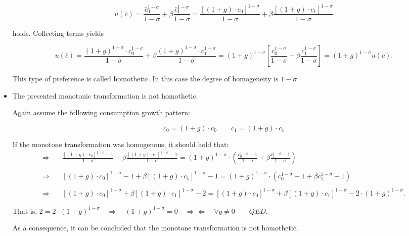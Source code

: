 \documentclass[12pt,a4paper]{article}
\begin{document}
\begin{itemize}
    $$  u(\bar{c}) = \frac{\bar{c}_0^{1 - \sigma}}{1 - \sigma} + \beta \frac{\bar{c}_1^{1 - \sigma}}{1 - \sigma} = \frac{[(1 + g) \cdot c_0]^{1-\sigma}}{1-\sigma} + \beta \frac{[(1 + g) \cdot c_1]^{1-\sigma}}{1-\sigma} $$

holds. Collecting terms yields

  $$  u(\bar{c}) = \frac{(1 + g)^{1-\sigma} \cdot c_0^{1-\sigma}}{1-\sigma} + \beta \frac{(1 + g)^{1-\sigma} \cdot c_1^{1-\sigma}}{1-\sigma} = (1 + g)^{1-\sigma} \left[  \frac{c_0^{1 - \sigma}}{1 - \sigma} + \beta \frac{c_1^{1 - \sigma}}{1 - \sigma} \right] = (1 + g)^{1-\sigma} u(c).$$

This type of preference is called homothetic. In this case the degree of homogeneity is $1-\sigma$.

  \item The presented monotonic transformation is not homothetic.

Again assume the following consumption growth pattern:

$$  \bar{c}_0 = (1 + g) \cdot c_0 \qquad \bar{c}_1 = (1 + g) \cdot c_1 $$

If the monotone transformation was homogenous, it should hold that:
\begin{align*}
      \Rightarrow & \quad \frac{[(1 + g) \cdot c_0]^{1-\sigma} - 1}{1-\sigma} + \beta \frac{[(1 + g) \cdot c_1]^{1-\sigma} - 1}{1-\sigma} = (1+g)^{1 - \sigma} \cdot \left( \frac{c_0^{1-\sigma} - 1}{1-\sigma} + \beta \frac{c_1^{1-\sigma} - 1}{1-\sigma} \right) \\
      & \\
      \Rightarrow & \quad [(1 + g) \cdot c_0]^{1-\sigma} - 1 + \beta [(1 + g) \cdot c_1]^{1-\sigma} - 1 = (1+g)^{1 - \sigma} \cdot \left( c_0^{1-\sigma} - 1 + \beta c_1^{1-\sigma} - 1 \right) \\
      & \\
      \Rightarrow & \quad [(1 + g) \cdot c_0]^{1-\sigma} + \beta [(1 + g) \cdot c_1]^{1-\sigma} - 2 = [(1 + g) \cdot c_0]^{1 - \sigma} + \beta [(1 + g) \cdot c_1]^{1-\sigma}- 2 \cdot (1 + g)^{1 - \sigma}.
    \end{align*}

That is, $ 2 = 2 \cdot (1 + g)^{1 - \sigma} \quad \Rightarrow \quad (1 + g)^{1 - \sigma} = 0 \quad \Rightarrow\Leftarrow \quad \forall g \neq 0 \qquad QED.$

As a consequence, it can be concluded that the monotone transformation is not homothetic.

\end{itemize}
\end{document}
